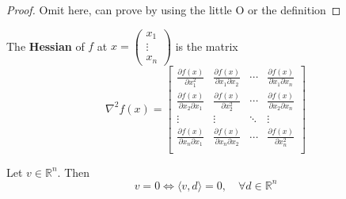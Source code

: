 \begin{proof}
    Omit here, can prove by using the little O or the definition
\end{proof}
\begin{definition}[Hessian]
    The \textbf{Hessian} of $f$ at $x = \begin{pmatrix}
        x_1 \\ \vdots \\ x_n
    \end{pmatrix}$ is the matrix
    $$\nabla^2 f(x) = \begin{bmatrix}
        \frac{\partial f(x)}{\partial x^2_1} & \frac{\partial f(x)}{\partial x_1 \partial x_2} & \cdots & \frac{\partial f(x)}{\partial x_1 \partial x_n} \\
        \frac{\partial f(x)}{\partial x_2 \partial x_1} & \frac{\partial f(x)}{\partial x_2^2} & \cdots & \frac{\partial f(x)}{\partial x_2 \partial x_n} \\
        \vdots & \vdots & \ddots & \vdots \\
        \frac{\partial f(x)}{\partial x_n \partial x_1} & \frac{\partial f(x)}{\partial x_n \partial x_2} & \cdots & \frac{\partial f(x)}{\partial x_n^2} \\
    \end{bmatrix}$$
\end{definition}

\begin{lemma}
    Let $v \in \mathbb R^n$. Then $$v = 0 \iff \langle v,d \rangle = 0, \quad \forall d \in \mathbb R^n$$
\end{lemma}

% 